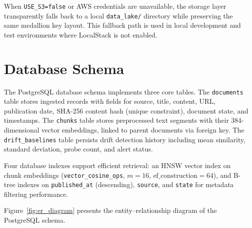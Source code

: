 When \texttt{USE\_S3=false} or AWS credentials are unavailable, the storage layer transparently falls back to a local \texttt{data\_lake/} directory while preserving the same medallion key layout. This fallback path is used in local development and test environments where LocalStack is not enabled.

\section{Database Schema}
\label{sec:schema}

The PostgreSQL database schema implements three core tables. The \texttt{documents} table stores ingested records with fields for source, title, content, URL, publication date, SHA-256 content hash (unique constraint), document state, and timestamps. The \texttt{chunks} table stores preprocessed text segments with their 384-dimensional vector embeddings, linked to parent documents via foreign key. The \texttt{drift\_baselines} table persists drift detection history including mean similarity, standard deviation, probe count, and alert status.

Four database indexes support efficient retrieval: an HNSW vector index on chunk embeddings (\texttt{vector\_cosine\_ops}, $m=16$, $\text{ef\_construction}=64$), and B-tree indexes on \texttt{published\_at} (descending), \texttt{source}, and \texttt{state} for metadata filtering performance.

Figure~\ref{fig:er_diagram} presents the entity--relationship diagram of the PostgreSQL schema.

